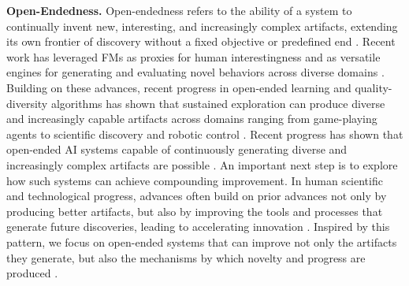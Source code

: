 \documentclass[]{fairmeta}
\begin{document}
\textbf{Open-Endedness.}
Open-endedness refers to the ability of a system to continually invent new, interesting, and increasingly complex artifacts, extending its own frontier of discovery without a fixed objective or predefined end \citep{stanley2017open, hughes2024open}. Recent work has leveraged FMs as proxies for human interestingness and as versatile engines for generating and evaluating novel behaviors across diverse domains \citep{zhangomni, faldoromni}. Building on these advances, recent progress in open-ended learning \citep{huautomated, zoph2017neural, colas2023augmenting, lehman2023evolution} and quality-diversity algorithms \citep{lehman2011evolving, mouret2015illuminating, bradley2023quality, samvelyan2024rainbow, dingquality, pourcel2023aces, coiffard2025overcoming, dharna2025foundation, yuan2026agenticred} has shown that sustained exploration can produce diverse and increasingly capable artifacts across domains ranging from game-playing agents \citep{klissarov2023motif, klissarovmaestromotif, wangvoyager} to scientific discovery \citep{lu2024discovering, lu2024ai, romera2024mathematical, novikov2025alphaevolve, audran2025does} and robotic control \citep{cully2015robots, li2024auto, grillotti2025tabula}. Recent progress has shown that open-ended AI systems capable of continuously generating diverse and increasingly complex artifacts are possible \citep{zhangomni, faldoromni, huautomated}. An important next step is to explore how such systems can achieve compounding improvement. In human scientific and technological progress, advances often build on prior advances not only by producing better artifacts, but also by improving the tools and processes that generate future discoveries, leading to accelerating innovation \citep{good1966speculations, kwa2025measuring}. Inspired by this pattern, we focus on open-ended systems that can improve not only the artifacts they generate, but also the mechanisms by which novelty and progress are produced \citep{clune2019ai, jiang2023general}.
\end{document}
